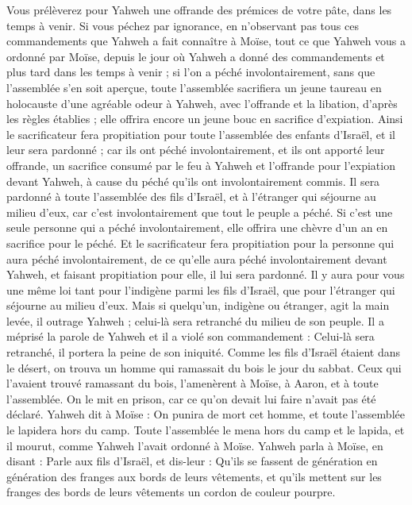 \begin{multicols}{2}
Vous prélèverez pour Yahweh une offrande des prémices de votre pâte, dans les temps à venir.
Si vous péchez par ignorance, en n'observant pas tous ces commandements que Yahweh a fait connaître à Moïse,
tout ce que Yahweh vous a ordonné par Moïse, depuis le jour où Yahweh a donné des commandements et plus tard dans les temps à venir ;
si l'on a péché involontairement, sans que l'assemblée s'en soit aperçue, toute l'assemblée sacrifiera un jeune taureau en holocauste d'une agréable odeur à Yahweh, avec l'offrande et la libation, d'après les règles établies ; elle offrira encore un jeune bouc en sacrifice d'expiation.
Ainsi le sacrificateur fera propitiation pour toute l'assemblée des enfants d'Israël, et il leur sera pardonné ; car ils ont péché involontairement, et ils ont apporté leur offrande, un sacrifice consumé par le feu à Yahweh et l'offrande pour l'expiation devant Yahweh, à cause du péché qu'ils ont involontairement commis.
Il sera pardonné à toute l'assemblée des fils d'Israël, et à l'étranger qui séjourne au milieu d'eux, car c'est involontairement que tout le peuple a péché.
Si c'est une seule personne qui a péché involontairement, elle offrira une chèvre d'un an en sacrifice pour le péché.
Et le sacrificateur fera propitiation pour la personne qui aura péché involontairement, de ce qu'elle aura péché involontairement devant Yahweh, et faisant propitiation pour elle, il lui sera pardonné.
Il y aura pour vous une même loi tant pour l'indigène parmi les fils d'Israël, que pour l'étranger qui séjourne au milieu d'eux.
Mais si quelqu'un, indigène ou étranger, agit la main levée, il outrage Yahweh ; celui-là sera retranché du milieu de son peuple.
Il a méprisé la parole de Yahweh et il a violé son commandement : Celui-là sera retranché, il portera la peine de son iniquité.
Comme les fils d'Israël étaient dans le désert, on trouva un homme qui ramassait du bois le jour du sabbat.
Ceux qui l'avaient trouvé ramassant du bois, l'amenèrent à Moïse, à Aaron, et à toute l'assemblée.
On le mit en prison, car ce qu'on devait lui faire n'avait pas été déclaré.
Yahweh dit à Moïse : On punira de mort cet homme, et toute l'assemblée le lapidera hors du camp.
Toute l'assemblée le mena hors du camp et le lapida, et il mourut, comme Yahweh l'avait ordonné à Moïse.
Yahweh parla à Moïse, en disant :
Parle aux fils d'Israël, et dis-leur : Qu'ils se fassent de génération en génération des franges aux bords de leurs vêtements, et qu'ils mettent sur les franges des bords de leurs vêtements un cordon de couleur pourpre.

\end{multicols}
